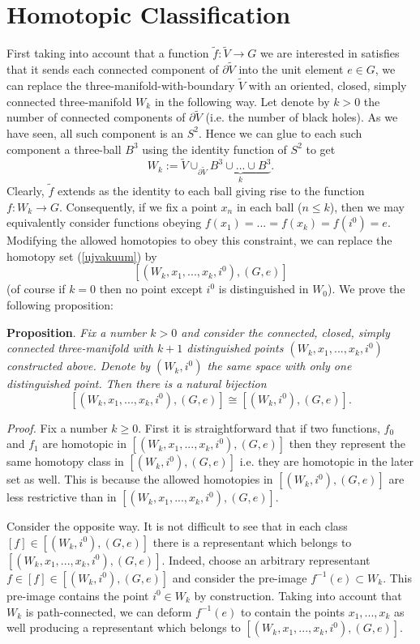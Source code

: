 \documentclass[a4paper,12pt,draft]{article}
\begin{document}
\section{Homotopic Classification}
First taking into account that a function
$\tilde{f}:\widetilde{V}\rightarrow G$ we are interested in satisfies
that it sends each connected component of $\partial\widetilde{V}$ into the
unit element $e\in G$, we can replace the 
three-manifold-with-boundary $\widetilde{V}$ with an oriented, closed,
simply connected three-manifold $W_k$ in the following way.
Let denote by $k>0$ the number of connected components of
$\partial\widetilde{V}$ (i.e. the number of black holes). As we have seen,
all such component is an $S^2$. Hence we can glue to each such component a
three-ball $B^3$ using the identity function of $S^2$ to get 
\[W_k:=\widetilde{V}\cup_{\partial\widetilde{V}}\underbrace{B^3
\cup ...\cup B^3}_k.\]
Clearly, $\tilde{f}$ extends as the identity to each ball giving rise to
the function $f: W_k\rightarrow G$.
Consequently, if we fix a point $x_n$ in each ball ($n\leq k$), then we
may equivalently consider functions obeying 
$f(x_1)=...=f(x_k)=f(i^0)=e$. Modifying the
allowed homotopies to obey this constraint, we can replace the homotopy
set (\ref{ujvakuum}) by
\[\left[ (W_k, x_1,...,x_k, i^0), (G,e)\right]\]
(of course if $k=0$ then no point except $i^0$ is distinguished in
$W_0$). We prove the following proposition:
\vspace{0.1in}

{\bf Proposition}. {\it Fix a number $k>0$ and consider the
connected, closed, simply connected three-manifold with $k+1$ distinguished 
points $(W_k, x_1,...,x_k, i^0)$ constructed above. Denote by
$(W_k, i^0)$ the same space with only one distinguished point.
Then there is a natural bijection}
\[\left[ (W_k, x_1,...,x_k, i^0), (G,e)\right]\cong\left[ (W_k, i^0),
(G,e)\right] .\]

 
{\it Proof.} Fix a number $k\geq 0$. First it is straightforward that if
two functions, $f_0$ and $f_1$ are homotopic in $\left[
(W_k, x_1,...,x_k, i^0), (G,e)\right]$ then they represent
the same homotopy class in $\left[ (W_k, i^0), (G,e)\right]$
i.e. they are homotopic in the later set as well. This is because the
allowed homotopies in $\left[ (W_k, i^0), (G,e)\right]$ are
less restrictive than in $\left[ (W_k, x_1,...,x_k, i^0), (G,e)\right]$. 

Consider the opposite way. It is not difficult to see that in each class
$[f]\in\left[ (W_k, i^0), (G,e)\right]$
there is a representant which belongs to $\left[ (W_k, 
x_1,...,x_k, i^0), (G,e)\right]$. Indeed, choose an arbitrary representant
$f\in [f]\in\left[ (W_k, i^0), (G,e)\right]$
and consider the pre-image $f^{-1}(e)\subset W_k$. This
pre-image contains the point $i^0\in W_k$ by construction.
Taking into account that $W_k$ is path-connected, we can 
deform $f^{-1}(e)$ to contain the points $x_1,...,x_k$ as well
producing a representant which belongs to $\left[ (W_k, x_1,...,x_k, i^0), 
(G,e)\right]$. 
\end{document}
